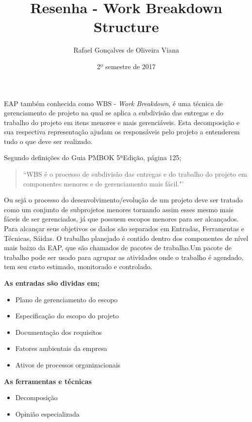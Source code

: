 \documentclass[12pt]{article}
\title{Resenha - Work Breakdown Structure}
\author{Rafael Gonçalves de  Oliveira Viana}
\date{2º semestre de 2017}
\begin{document}
\maketitle
EAP também conhecida como WBS - \textit{Work Breakdown}, é uma técnica de gerenciamento de projeto na qual se aplica a subdivisão das entregas e do trabalho do projeto em itens menores e mais gerenciáveis.
Esta decomposição e sua respectiva representação ajudam os responsáveis pelo projeto a entenderem tudo o que deve ser realizado.
 
Segundo definições do Guia PMBOK 5ªEdição, página 125;

 \begin{quote}
“WBS é o processo de subdivisão das entregas e do trabalho do projeto em componentes menores e de gerenciamento mais fácil."' 
\end{quote}

Ou sejá o processo  do desenvolvimento/evolução de um projeto deve ser tratado como um conjunto de subprojetos menores tornando assim esses mesmo mais fáceis de ser gerenciados, já que possuem escopos menores para ser alcançados.
Para alcançar seus objetivos os dados são separados em Entradas, Ferramentas e Técnicas, Sáidas.
O trabalho planejado é contido dentro dos componentes de nível mais baixo da EAP, que são chamados
de pacotes de trabalho.Um pacote de trabalho pode ser usado para agrupar as atividades onde o trabalho
é agendado, tem seu custo estimado, monitorado e controlado.

\textbf{As entradas são dividas em;}
	\begin{itemize}
		\begin{itemize}
		\item
		Plano de gerenciamento do escopo
		
		\item
		Especificação do escopo do projeto
		
		\item
		Documentação dos requisitos
		
		\item
		Fatores ambientais da empresa
		
		\item
		Ativos de processos organizacionais
	\end{itemize}
	\end{itemize}

\textbf{As ferramentas e técnicas}
	\begin{itemize}
	\begin{itemize}
		\item
		Decomposição
		
		\item
		Opinião especializada
		
		\end{itemize}
	\end{itemize}
\end{document}
